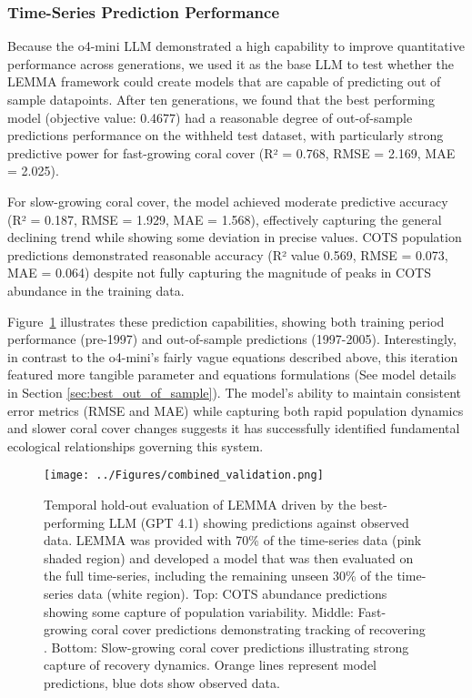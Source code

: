 \subsubsection{Time-Series Prediction Performance}

Because the o4-mini LLM demonstrated a high capability to improve quantitative performance across generations, we used it as the base LLM to test whether the LEMMA framework could create models that are capable of predicting out of sample datapoints. After ten generations, we found that the best performing model (objective value: 0.4677) had a reasonable degree of out-of-sample predictions performance on the withheld test dataset, with particularly strong predictive power for fast-growing coral cover (R² = 0.768, RMSE = 2.169, MAE = 2.025). 

For slow-growing coral cover, the model achieved moderate predictive accuracy (R² = 0.187, RMSE = 1.929, MAE = 1.568), effectively capturing the general declining trend while showing some deviation in precise values. COTS population predictions demonstrated reasonable accuracy (R² value 0.569, RMSE = 0.073, MAE = 0.064) despite not fully capturing the magnitude of peaks in COTS abundance in the training data.

Figure~\ref{fig:validation_combined} illustrates these prediction capabilities, showing both training period performance (pre-1997) and out-of-sample predictions (1997-2005). Interestingly, in contrast to the o4-mini's fairly vague equations described above, this iteration featured more tangible parameter and equations formulations (See model details in Section \ref{sec:best_out_of_sample}). The model's ability to maintain consistent error metrics (RMSE and MAE) while capturing both rapid population dynamics and slower coral cover changes suggests it has successfully identified fundamental ecological relationships governing this system.


\begin{figure}[H]
\centering
\texttt{[image: ../Figures/combined\_validation.png]}
\caption{Temporal hold-out evaluation of LEMMA driven by the best-performing LLM (GPT 4.1) showing predictions against observed data. LEMMA was provided with 70\% of the time-series data (pink shaded region) and developed a model that was then evaluated on the full time-series, including the remaining unseen 30\% of the time-series data (white region). Top: COTS abundance predictions showing some capture of population variability. Middle: Fast-growing coral cover predictions demonstrating tracking of recovering . Bottom: Slow-growing coral cover predictions illustrating strong capture of recovery dynamics. Orange lines represent model predictions, blue dots show observed data.}
\label{fig:validation_combined}
\end{figure}
